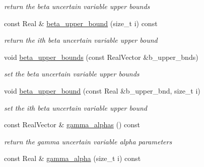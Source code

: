 \begin{DoxyCompactItemize}
\begin{DoxyCompactList}\small\item\em return the beta uncertain variable upper bounds \end{DoxyCompactList}\item 
const Real \& \hyperlink{classPecos_1_1AleatoryDistParams_ae40c31d8ff94841ee3007cb0a781506c}{beta\+\_\+upper\+\_\+bound} (size\+\_\+t i) const \label{classPecos_1_1AleatoryDistParams_ae40c31d8ff94841ee3007cb0a781506c}

\begin{DoxyCompactList}\small\item\em return the ith beta uncertain variable upper bound \end{DoxyCompactList}\item 
void \hyperlink{classPecos_1_1AleatoryDistParams_a4efa3bae2a5f2359a0e5cfe46392bf8a}{beta\+\_\+upper\+\_\+bounds} (const Real\+Vector \&b\+\_\+upper\+\_\+bnds)\label{classPecos_1_1AleatoryDistParams_a4efa3bae2a5f2359a0e5cfe46392bf8a}

\begin{DoxyCompactList}\small\item\em set the beta uncertain variable upper bounds \end{DoxyCompactList}\item 
void \hyperlink{classPecos_1_1AleatoryDistParams_affb3924cbf0f3e5149706a2ee1c941d5}{beta\+\_\+upper\+\_\+bound} (const Real \&b\+\_\+upper\+\_\+bnd, size\+\_\+t i)\label{classPecos_1_1AleatoryDistParams_affb3924cbf0f3e5149706a2ee1c941d5}

\begin{DoxyCompactList}\small\item\em set the ith beta uncertain variable upper bound \end{DoxyCompactList}\item 
const Real\+Vector \& \hyperlink{classPecos_1_1AleatoryDistParams_abd48a64f5c70a8c75fd08ecb67867da9}{gamma\+\_\+alphas} () const \label{classPecos_1_1AleatoryDistParams_abd48a64f5c70a8c75fd08ecb67867da9}

\begin{DoxyCompactList}\small\item\em return the gamma uncertain variable alpha parameters \end{DoxyCompactList}\item 
const Real \& \hyperlink{classPecos_1_1AleatoryDistParams_a7a92769a59d7dec1b18a9349fd5f686f}{gamma\+\_\+alpha} (size\+\_\+t i) const \label{classPecos_1_1AleatoryDistParams_a7a92769a59d7dec1b18a9349fd5f686f}


\end{DoxyCompactItemize}
